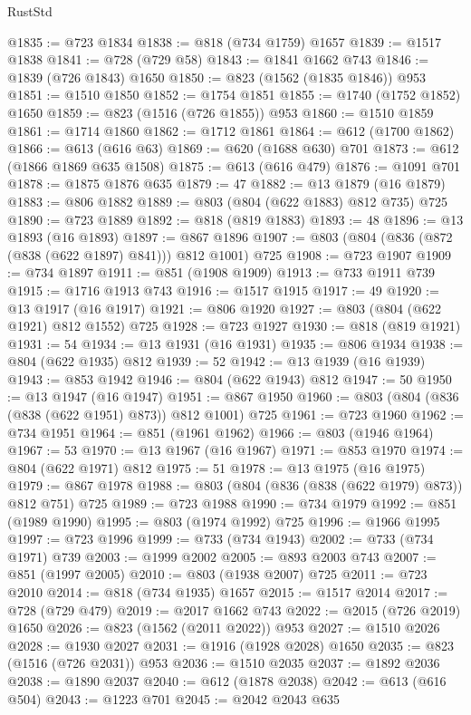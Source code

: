 \begin{lexlean}{RustStd}
\begin{coremodule}
@1835 := @723 @1834
@1838 := @818 (@734 @1759) @1657
@1839 := @1517 @1838
@1841 := @728 (@729 @58)
@1843 := @1841 @1662 @743
@1846 := @1839 (@726 @1843) @1650
@1850 := @823 (@1562 (@1835 @1846)) @953
@1851 := @1510 @1850
@1852 := @1754 @1851
@1855 := @1740 (@1752 @1852) @1650
@1859 := @823 (@1516 (@726 @1855)) @953
@1860 := @1510 @1859
@1861 := @1714 @1860
@1862 := @1712 @1861
@1864 := @612 (@1700 @1862)
@1866 := @613 (@616 @63)
@1869 := @620 (@1688 @630) @701
@1873 := @612 (@1866 @1869 @635 @1508)
@1875 := @613 (@616 @479)
@1876 := @1091 @701
@1878 := @1875 @1876 @635
@1879 := 47
@1882 := @13 @1879 (@16 @1879)
@1883 := @806 @1882
@1889 := @803 (@804 (@622 @1883) @812 @735) @725
@1890 := @723 @1889
@1892 := @818 (@819 @1883)
@1893 := 48
@1896 := @13 @1893 (@16 @1893)
@1897 := @867 @1896
@1907 := @803 (@804 (@836 (@872 (@838 (@622 @1897) @841))) @812 @1001) @725
@1908 := @723 @1907
@1909 := @734 @1897
@1911 := @851 (@1908 @1909)
@1913 := @733 @1911 @739
@1915 := @1716 @1913 @743
@1916 := @1517 @1915
@1917 := 49
@1920 := @13 @1917 (@16 @1917)
@1921 := @806 @1920
@1927 := @803 (@804 (@622 @1921) @812 @1552) @725
@1928 := @723 @1927
@1930 := @818 (@819 @1921)
@1931 := 54
@1934 := @13 @1931 (@16 @1931)
@1935 := @806 @1934
@1938 := @804 (@622 @1935) @812
@1939 := 52
@1942 := @13 @1939 (@16 @1939)
@1943 := @853 @1942
@1946 := @804 (@622 @1943) @812
@1947 := 50
@1950 := @13 @1947 (@16 @1947)
@1951 := @867 @1950
@1960 := @803 (@804 (@836 (@838 (@622 @1951) @873)) @812 @1001) @725
@1961 := @723 @1960
@1962 := @734 @1951
@1964 := @851 (@1961 @1962)
@1966 := @803 (@1946 @1964)
@1967 := 53
@1970 := @13 @1967 (@16 @1967)
@1971 := @853 @1970
@1974 := @804 (@622 @1971) @812
@1975 := 51
@1978 := @13 @1975 (@16 @1975)
@1979 := @867 @1978
@1988 := @803 (@804 (@836 (@838 (@622 @1979) @873)) @812 @751) @725
@1989 := @723 @1988
@1990 := @734 @1979
@1992 := @851 (@1989 @1990)
@1995 := @803 (@1974 @1992) @725
@1996 := @1966 @1995
@1997 := @723 @1996
@1999 := @733 (@734 @1943)
@2002 := @733 (@734 @1971) @739
@2003 := @1999 @2002
@2005 := @893 @2003 @743
@2007 := @851 (@1997 @2005)
@2010 := @803 (@1938 @2007) @725
@2011 := @723 @2010
@2014 := @818 (@734 @1935) @1657
@2015 := @1517 @2014
@2017 := @728 (@729 @479)
@2019 := @2017 @1662 @743
@2022 := @2015 (@726 @2019) @1650
@2026 := @823 (@1562 (@2011 @2022)) @953
@2027 := @1510 @2026
@2028 := @1930 @2027
@2031 := @1916 (@1928 @2028) @1650
@2035 := @823 (@1516 (@726 @2031)) @953
@2036 := @1510 @2035
@2037 := @1892 @2036
@2038 := @1890 @2037
@2040 := @612 (@1878 @2038)
@2042 := @613 (@616 @504)
@2043 := @1223 @701
@2045 := @2042 @2043 @635

\end{coremodule}
\end{lexlean}

